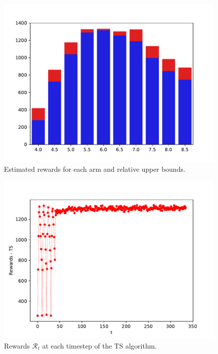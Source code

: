 \documentclass[12pt,a4paper]{report}
\begin{document}
\begin{figure}[H]
\centering
  \includegraphics[scale = 0.7, center]{3ucb}
  \caption{Estimated rewards for each arm and relative upper bounds.}
\end{figure}
\begin{figure}[H]
\centering
  \includegraphics[scale = 0.7, center]{3rew}
  \caption{Rewards $\mathcal R_t$ at each timestep of the TS algorithm.}
\end{figure}
\end{document}
